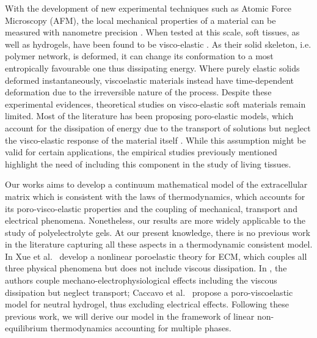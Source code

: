 With the development of new experimental techniques such as Atomic Force Microscopy (AFM), the local mechanical properties of a material can be measured with nanometre precision \cite{viscoporo}. When tested at this scale, soft tissues, as well as hydrogels, have been found to be visco-elastic \cite{ex5}. As their solid skeleton, i.e. polymer network, is deformed, it can change its conformation to a most entropically favourable one thus dissipating energy. Where purely elastic solids deformed instantaneously, viscoelastic materials instead have time-dependent deformation due to the irreversible nature of the process. 
Despite these experimental evidences, theoretical studies on visco-elastic soft materials remain limited. Most of the literature has been proposing poro-elastic models, which account for the dissipation of energy due to the transport of solutions but neglect the visco-elastic response of the material itself \cite{Article1}. While this assumption might be valid for certain applications, the empirical studies previously mentioned highlight the need of including this component in the study of living tissues. 

Our works aims to develop a continuum mathematical model of the extracellular matrix which is consistent with the laws of thermodynamics, which accounts for its poro-visco-elastic properties and the coupling of mechanical, transport and electrical phenomena. Nonetheless, our results are more widely applicable to the study of polyelectrolyte gels. At our present knowledge, there is no previous work in the literature capturing all these aspects in a thermodynamic consistent model. In \cite{ecm1,ecm2} Xue et al.~ develop a nonlinear poroelastic theory for ECM, which couples all three physical phenomena but does not include viscous dissipation. In \cite{Jeru}, the authors couple mechano-electrophysiological effects including the viscous dissipation but neglect transport; Caccavo et al.~ \cite{Article1} propose a poro-viscoelastic model for neutral hydrogel, thus excluding electrical effects. Following these previous work, we will derive our model in the framework of linear non-equilibrium thermodynamics \cite{NET} accounting for multiple phases.

